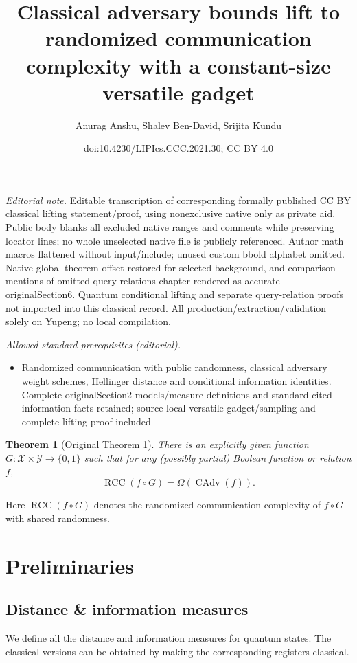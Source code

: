 \documentclass[10pt,a4paper]{article}
\title{Classical adversary bounds lift to randomized communication complexity with a constant-size versatile gadget}
\author{Anurag Anshu, Shalev Ben-David, Srijita Kundu}
\date{doi:10.4230/LIPIcs.CCC.2021.30; CC BY 4.0}
\newtheorem{theorem}{Theorem}
\theoremstyle{definition}
\newcommand{\B}{\{0,1\}}
\newcommand{\X}{\mathcal{X}}
\newcommand{\Y}{\mathcal{Y}}
\renewcommand{\>}{\rangle}
\newcommand{\<}{\langle}
\DeclareMathOperator{\CAdv}{CAdv}
\DeclareMathOperator{\RCC}{RCC}
\begin{document}
\maketitle
\noindent\textit{Editorial note.} Editable transcription of corresponding formally published CC BY classical lifting statement/proof, using nonexclusive native only as private aid. Public body blanks all excluded native ranges and comments while preserving locator lines; no whole unselected native file is publicly referenced. Author math macros flattened without input/include; unused custom bbold alphabet omitted. Native global theorem offset restored for selected background, and comparison mentions of omitted query-relations chapter rendered as accurate originalSection6. Quantum conditional lifting and separate query-relation proofs not imported into this classical record. All production/extraction/validation solely on Yupeng; no local compilation.\par\medskip
\noindent\textit{Allowed standard prerequisites (editorial).}\begin{itemize}
\item Randomized communication with public randomness, classical adversary weight schemes, Hellinger distance and conditional information identities. Complete originalSection2 models/measure definitions and standard cited information facts retained; source-local versatile gadget/sampling and complete lifting proof included
\end{itemize}\medskip
\begin{theorem}[Original Theorem 1]\label{thm:CAdv_lift}
There is an explicitly given function $G:\X\times\Y\to\B$ such that for any (possibly partial) Boolean function or relation $f$,
\[\RCC(f\circ G)=\Omega(\CAdv(f)).\]
\end{theorem}
Here $\RCC(f\circ G)$ denotes the randomized communication complexity of $f\circ G$ with shared randomness.

\setcounter{section}{1}\setcounter{theorem}{8}\section{Preliminaries}
\subsection{Distance \& information measures}
We define all the distance and information measures for quantum states. The classical versions can be obtained by making the corresponding registers classical.
\end{document}
